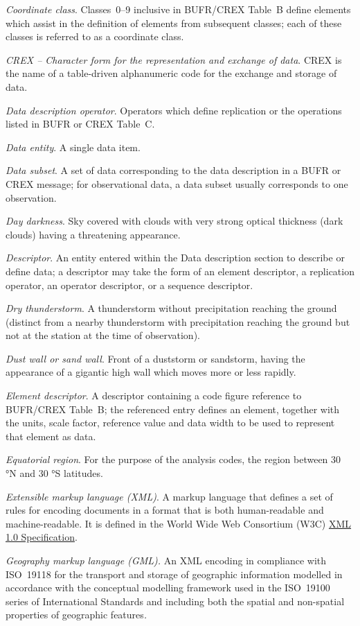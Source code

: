 \emph{Coordinate class}. Classes~0--9 inclusive in BUFR/CREX Table~B define elements which assist in the definition of elements from subsequent classes; each of these classes is referred to as a coordinate class.

\emph{CREX -- Character form for the representation and exchange of data}. CREX is the name of a table-driven alphanumeric code for the exchange and storage of data.

\emph{Data description operator}. Operators which define replication or the operations listed in BUFR or CREX Table~C.

\emph{Data entity}. A single data item.

\emph{Data subset}. A set of data corresponding to the data description in a BUFR or CREX message; for observational data, a data subset usually corresponds to one observation.

\emph{Day darkness}. Sky covered with clouds with very strong optical thickness (dark clouds) having a threatening appearance.

\emph{Descriptor}. An entity entered within the Data description section to describe or define data; a descriptor may take the form of an element descriptor, a replication operator, an operator descriptor, or a sequence descriptor.

\emph{Dry thunderstorm}. A thunderstorm without precipitation reaching the ground (distinct from a nearby thunderstorm with precipitation reaching the ground but not at the station at the time of observation).

\emph{Dust wall or sand wall}. Front of a duststorm or sandstorm, having the appearance of a gigantic high wall which moves more or less rapidly.

\emph{Element descriptor}. A descriptor containing a code figure reference to BUFR/CREX Table~B; the referenced entry defines an element, together with the units, scale factor, reference value and data width to be used to represent that element as data.

\emph{Equatorial region}. For the purpose of the analysis codes, the region between 30 °N and 30 °S latitudes.

\emph{Extensible markup language (XML)}. A markup language that defines a set of rules for encoding documents in a format that is both human-readable and machine-readable. It is defined in the World Wide Web Consortium (W3C) \href{http://www.w3.org/TR/REC-xml/}{XML 1.0 Specification}.

\emph{Geography markup language (GML).} An XML encoding in compliance with ISO~19118 for the transport and storage of geographic information modelled in accordance with the conceptual modelling framework used in the ISO~19100 series of International Standards and including both the spatial and non-spatial properties of geographic features\emph{.}

